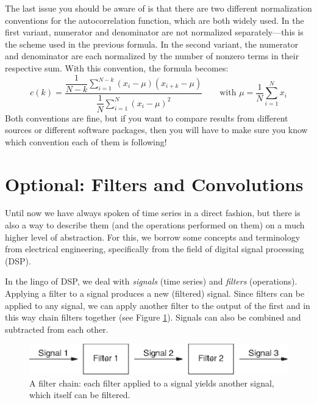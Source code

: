 The last issue you should be aware of is that there are two different
normalization conventions for the autocorrelation function, which are
both widely used. In the first variant, numerator and denominator are
not normalized separately---this is the scheme used in the previous
formula.  In the second variant, the numerator and denominator are
each normalized by the number of nonzero terms in their respective
sum.  With this convention, the formula becomes:
%
\[
c(k) = \frac{ \dfrac{1}{N-k} \sum\limits_{i=1}^{N-k} 
                                        (x_i - \mu)(x_{i+k} - \mu) }
            { \dfrac{1}{N} \sum\limits_{i=1}^N (x_i - \mu)^2 }
       \qquad \text{with } \mu = \frac{1}{N} \sum_{i=1}^N x_i
\]
%
Both conventions are fine, but if you want to compare results from
different sources or different software packages, then you will have
to make sure you know which convention each of them is following!\vspace*{-9pt}


\section{Optional: Filters and Convolutions}

 
Until now we have always spoken of time series in a direct fashion,
but there is also a way to describe them (and the operations performed
on them) on a much higher level of abstraction. For this, we borrow
some concepts and terminology from electrical engineering,
specifically from the field of digital signal processing (DSP).  

In the lingo of DSP, we deal with \emph{signals} (time series) and
\emph{filters} (operations). Applying a filter to a signal produces a
new (filtered) signal. Since filters can be applied to any signal, we
can apply another filter to the output of the first and in this way
chain filters together (see Figure \ref{fig:filterchain}).  Signals
can also be combined and subtracted from each other.

\begin{figure}
  \includegraphics{img/filterchain}
  \caption{A filter chain: each filter applied to a signal yields another
    signal, which itself can be filtered.}
  \label{fig:filterchain}\vspace*{-9pt}
\end{figure} 

